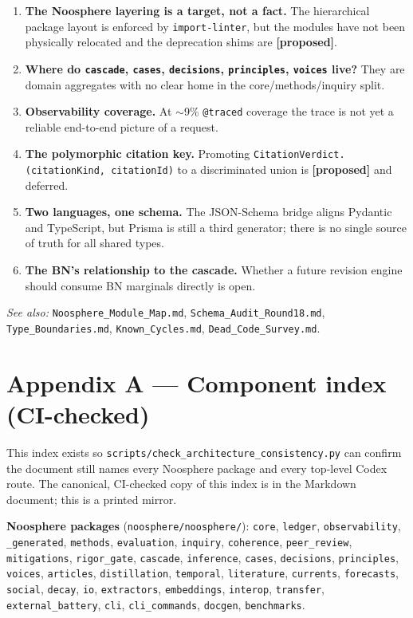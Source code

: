 \documentclass[11pt]{article}
\begin{document}
\begin{enumerate}[leftmargin=1.6em]
  \item \textbf{The Noosphere layering is a target, not a fact.} The
  hierarchical package layout is enforced by \texttt{import-linter}, but the
  modules have not been physically relocated and the deprecation shims are
  \textbf{[proposed]}.
  \item \textbf{Where do \texttt{cascade}, \texttt{cases}, \texttt{decisions},
  \texttt{principles}, \texttt{voices} live?} They are domain aggregates with
  no clear home in the core/methods/inquiry split.
  \item \textbf{Observability coverage.} At $\sim$9\% \texttt{@traced}
  coverage the trace is not yet a reliable end-to-end picture of a request.
  \item \textbf{The polymorphic citation key.} Promoting
  \texttt{CitationVerdict.(citationKind, citationId)} to a discriminated union
  is \textbf{[proposed]} and deferred.
  \item \textbf{Two languages, one schema.} The JSON-Schema bridge aligns
  Pydantic and TypeScript, but Prisma is still a third generator; there is no
  single source of truth for all shared types.
  \item \textbf{The BN's relationship to the cascade.} Whether a future
  revision engine should consume BN marginals directly is open.
\end{enumerate}

\textit{See also:} \texttt{Noosphere\_Module\_Map.md},
\texttt{Schema\_Audit\_Round18.md}, \texttt{Type\_Boundaries.md},
\texttt{Known\_Cycles.md}, \texttt{Dead\_Code\_Survey.md}.

\section*{Appendix A --- Component index (CI-checked)}

This index exists so \texttt{scripts/check\_architecture\_consistency.py} can
confirm the document still names every Noosphere package and every top-level
Codex route. The canonical, CI-checked copy of this index is in the Markdown
document; this is a printed mirror.

\textbf{Noosphere packages} (\texttt{noosphere/noosphere/}):
\texttt{core}, \texttt{ledger}, \texttt{observability}, \texttt{\_generated},
\texttt{methods}, \texttt{evaluation}, \texttt{inquiry}, \texttt{coherence},
\texttt{peer\_review}, \texttt{mitigations}, \texttt{rigor\_gate},
\texttt{cascade}, \texttt{inference}, \texttt{cases}, \texttt{decisions},
\texttt{principles}, \texttt{voices}, \texttt{articles},
\texttt{distillation}, \texttt{temporal}, \texttt{literature},
\texttt{currents}, \texttt{forecasts}, \texttt{social}, \texttt{decay},
\texttt{io}, \texttt{extractors}, \texttt{embeddings}, \texttt{interop},
\texttt{transfer}, \texttt{external\_battery}, \texttt{cli},
\texttt{cli\_commands}, \texttt{docgen}, \texttt{benchmarks}.
\end{document}
